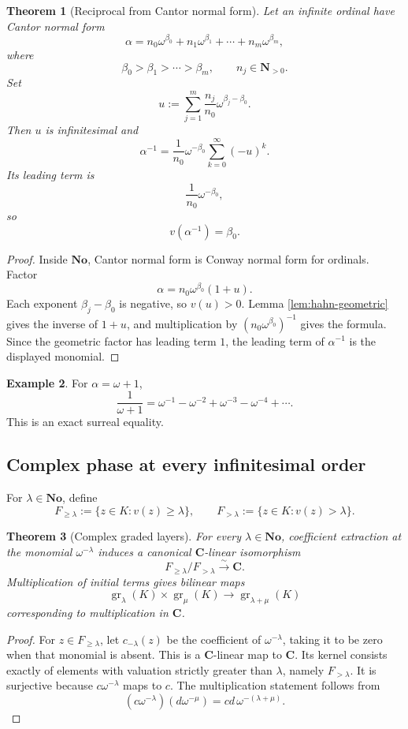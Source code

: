 \documentclass[11pt]{amsart}
\numberwithin{equation}{section}
\newtheorem{theorem}{Theorem}[section]
\theoremstyle{definition}
\newtheorem{example}[theorem]{Example}
\newcommand{\C}{\mathbf C}
\newcommand{\N}{\mathbf N}
\newcommand{\No}{\mathbf{No}}
\newcommand{\gr}{\operatorname{gr}}
\begin{document}
\begin{theorem}[Reciprocal from Cantor normal form]\label{thm:ordinal-inverse-expansion}
Let an infinite ordinal have Cantor normal form
\[
\alpha
=
n_0\omega^{\beta_0}
+n_1\omega^{\beta_1}
+\cdots
+n_m\omega^{\beta_m},
\]
where
\[
\beta_0>\beta_1>\cdots>\beta_m,
\qquad
n_j\in\N_{>0}.
\]
Set
\[
u:=
\sum_{j=1}^{m}
\frac{n_j}{n_0}\omega^{\beta_j-\beta_0}.
\]
Then $u$ is infinitesimal and
\[
\boxed{
\alpha^{-1}
=
\frac1{n_0}\omega^{-\beta_0}
\sum_{k=0}^{\infty}(-u)^k.}
\]
Its leading term is
\[
\frac1{n_0}\omega^{-\beta_0},
\]
so
\[
v(\alpha^{-1})=\beta_0.
\]
\end{theorem}

\begin{proof}
Inside $\No$, Cantor normal form is Conway normal form for ordinals.  Factor
\[
\alpha
=
n_0\omega^{\beta_0}(1+u).
\]
Each exponent $\beta_j-\beta_0$ is negative, so $v(u)>0$.  Lemma \ref{lem:hahn-geometric} gives the inverse of $1+u$, and multiplication by $(n_0\omega^{\beta_0})^{-1}$ gives the formula.  Since the geometric factor has leading term $1$, the leading term of $\alpha^{-1}$ is the displayed monomial.
\end{proof}

\begin{example}
For $\alpha=\omega+1$,
\[
\frac1{\omega+1}
=
\omega^{-1}
-\omega^{-2}
+\omega^{-3}
-\omega^{-4}
+\cdots.
\]
This is an exact surreal equality.
\end{example}

\subsection{Complex phase at every infinitesimal order}

For $\lambda\in\No$, define
\[
F_{\ge\lambda}:=\{z\in K:v(z)\ge\lambda\},
\qquad
F_{>\lambda}:=\{z\in K:v(z)>\lambda\}.
\]

\begin{theorem}[Complex graded layers]\label{thm:complex-graded-layers}
For every $\lambda\in\No$, coefficient extraction at the monomial $\omega^{-\lambda}$ induces a canonical $\C$-linear isomorphism
\[
F_{\ge\lambda}/F_{>\lambda}
\xrightarrow{\sim}
\C.
\]
Multiplication of initial terms gives bilinear maps
\[
\gr_\lambda(K)\times\gr_\mu(K)
\longrightarrow
\gr_{\lambda+\mu}(K)
\]
corresponding to multiplication in $\C$.
\end{theorem}

\begin{proof}
For $z\in F_{\ge\lambda}$, let $c_{-\lambda}(z)$ be the coefficient of $\omega^{-\lambda}$, taking it to be zero when that monomial is absent.  This is a $\C$-linear map to $\C$.  Its kernel consists exactly of elements with valuation strictly greater than $\lambda$, namely $F_{>\lambda}$.  It is surjective because $c\omega^{-\lambda}$ maps to $c$.  The multiplication statement follows from
\[
(c\omega^{-\lambda})(d\omega^{-\mu})
=cd\,\omega^{-(\lambda+\mu)}.
\]
\end{proof}
\end{document}
